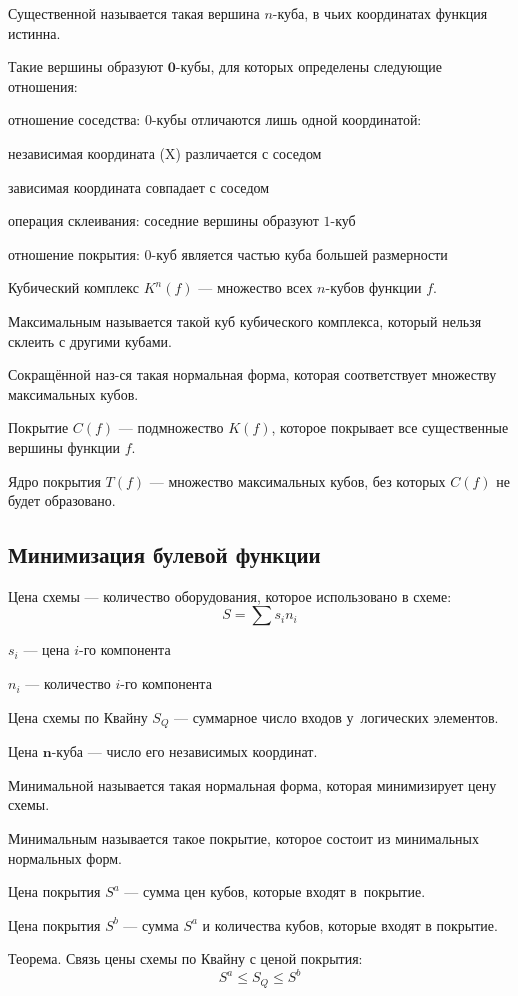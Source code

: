 {\bold Существенной} называется такая вершина $n$-куба, в чьих координатах функция {\ital истинна}.

Такие вершины образуют {\bold $\symbf{0}$-кубы}, для которых определены следующие отношения:
\begin{list*}
\item {\bold отношение соседства}: $0$-кубы отличаются лишь {\ital одной} координатой:
\begin{list*}[2]
\item {\ital независимая координата {\color{desc}(X)}} различается с соседом
\item {\ital зависимая координата} совпадает с соседом
\end{list*}
\item {\bold операция склеивания}: соседние вершины образуют $1$-куб
\item {\bold отношение покрытия}: $0$-куб является частью куба большей размерности
\end{list*}
{\bold Кубический комплекс} $K^n(f)$ --- множество всех $n$-кубов функции $f$.

{\bold Максимальным} называется такой куб кубического комплекса, который {\ital нельзя склеить} с другими кубами.

{\bold Сокращённой} наз-ся такая нормальная форма, которая соответствует множеству {\ital максимальных} кубов.

{\bold Покрытие} $C(f)$ --- подмножество $K(f)$, которое покрывает все существенные вершины функции $f$.

{\bold Ядро покрытия} $T(f)$ --- множество максимальных кубов, без которых $C(f)$ не будет образовано.

\subsection{Минимизация булевой функции}

{\bold Цена схемы} --- количество оборудования, которое использовано в схеме:
$$S=\sum s_in_i$$
\begin{list*}
\item $s_i$ --- цена $i$-го компонента
\item $n_i$ --- количество $i$-го компонента
\end{list*}
{\bold Цена схемы по Квайну} $S_Q$ --- суммарное число входов у~логических элементов.

{\bold Цена $\symbf{n}$-куба} --- число его независимых координат.

{\bold Минимальной} называется такая нормальная форма, которая {\ital минимизирует} цену схемы.

{\bold Минимальным} называется такое покрытие, которое состоит из {\ital минимальных} нормальных форм.

{\bold Цена покрытия} $S^a$ --- сумма цен кубов, которые входят в~покрытие.

{\bold Цена покрытия} $S^b$ --- сумма $S^a$ и количества кубов, которые входят в покрытие.

\begin{theorem}
{\bold Теорема.} Связь цены схемы по Квайну с ценой покрытия:
$$S^a\leq S_Q\leq S^b$$
\end{theorem}
